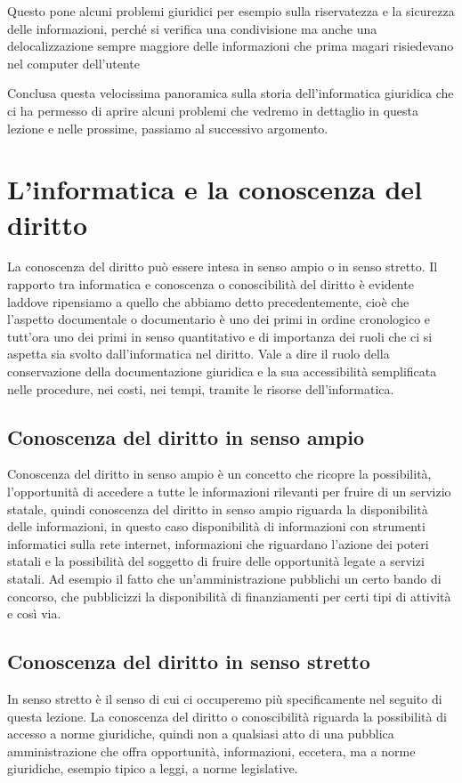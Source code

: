 Questo pone alcuni problemi giuridici per esempio sulla riservatezza e la sicurezza delle informazioni, perché si verifica una condivisione ma anche una delocalizzazione sempre maggiore delle informazioni che prima magari risiedevano nel computer dell'utente
 
Conclusa questa velocissima panoramica sulla storia dell'informatica giuridica che ci ha permesso di aprire alcuni problemi che vedremo in dettaglio in questa lezione e nelle prossime, passiamo al successivo argomento.

\section{L'informatica e la conoscenza del diritto}

La conoscenza del diritto può essere intesa in senso ampio o in senso stretto. Il rapporto tra informatica e conoscenza o conoscibilità del diritto è evidente laddove ripensiamo a quello che abbiamo detto precedentemente, cioè che l'aspetto documentale o documentario è uno dei primi in ordine cronologico e tutt'ora uno dei primi in senso quantitativo e di importanza dei ruoli che ci si aspetta sia svolto dall'informatica nel diritto. 
Vale a dire il ruolo della conservazione della documentazione giuridica e la sua accessibilità semplificata nelle procedure, nei costi, nei tempi, tramite le risorse dell'informatica.

\subsection{Conoscenza del diritto in senso ampio}
Conoscenza del diritto in senso ampio è un concetto che ricopre la possibilità, l'opportunità di accedere a tutte le informazioni rilevanti per fruire di un servizio statale, quindi conoscenza del diritto in senso ampio riguarda la disponibilità delle informazioni, in questo caso disponibilità di  informazioni con strumenti informatici sulla rete internet, informazioni che riguardano l'azione dei poteri statali e la possibilità del soggetto di fruire delle opportunità legate a servizi statali. Ad esempio il fatto che un'amministrazione pubblichi un certo bando di concorso, che pubblicizzi la disponibilità di finanziamenti per certi tipi di attività e così via. 

\subsection{Conoscenza del diritto in senso stretto}
In senso stretto è il senso di cui ci occuperemo più specificamente nel seguito di questa lezione.
La conoscenza del diritto o conoscibilità riguarda la possibilità di accesso a norme giuridiche, quindi non a qualsiasi atto di una pubblica amministrazione che offra opportunità, informazioni, eccetera, ma a norme giuridiche, esempio tipico a leggi, a norme legislative.

